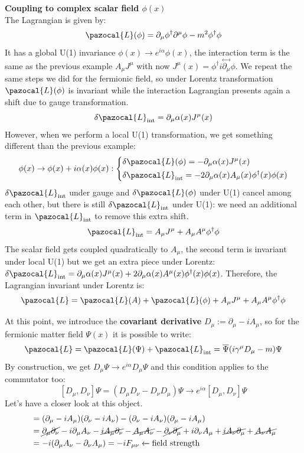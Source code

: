 \documentclass[../main.tex]{subfiles}
\begin{document}
\begin{example}
\textbf{Coupling to complex scalar field $\phi(x)$}\\
The Lagrangian is given by:
\[
\pazocal{L}(\phi)=\partial_\mu\phi^\dagger\partial^\mu\phi-m^2\phi^\dagger\phi
\]
It has a global U(1) invariance $\phi(x)\to e^{i\alpha}\phi(x)$, the interaction term is the same as the previous example $A_\mu J^\mu$ with now $J^\mu(x)=\phi^\dagger i\overset{\leftrightarrow}{\partial_\mu}\phi$. We repeat the same steps we did for the fermionic field, so under Lorentz transformation $\pazocal{L}(\phi)$ is invariant while the interaction Lagrangian presents again a shift due to gauge transformation.
\[
\delta\pazocal{L}_{\text{int}}=\partial_\mu\alpha(x)J^\mu(x)
\]
However, when we perform a local U(1) transformation, we get something different than the previous example:
\[
\phi(x)\to\phi(x)+i\alpha(x)\phi(x):\left\{
\begin{aligned}
&\delta\pazocal{L}(\phi)=-\partial_\mu\alpha(x)J^\mu(x)\\
&\delta\pazocal{L}_{\text{int}}=-2\partial_\mu\alpha(x)A_\mu(x)\phi^\dagger(x)\phi(x)
\end{aligned}
\right.
\]
$\delta\pazocal{L}_{\text{int}}$ under gauge and $\delta\pazocal{L}(\phi)$ under U(1) cancel among each other, but there is still $\delta\pazocal{L}_{\text{int}}$ under U(1): we need an additional term in $\pazocal{L}_{\text{int}}$ to remove this extra shift.
\[
\pazocal{L}_{\text{int}}=A_\mu J^\mu+A_\mu A^\mu\phi^\dagger\phi
\]
The scalar field gets coupled quadratically to $A_\mu$, the second term is invariant under local U(1) but we get an extra piece under Lorentz: $\delta\pazocal{L}_{\text{int}}=\partial_\mu\alpha(x)J^\mu(x)+2\partial_\mu\alpha(x)A^\mu(x)\phi^\dagger(x)\phi(x)$. Therefore, the Lagrangian invariant under Lorentz is:
\[
\pazocal{L}=\pazocal{L}(A)+\pazocal{L}(\phi)+A_\mu J^\mu+A_\mu A^\mu\phi^\dagger\phi
\]
\end{example}
At this point, we introduce the \textbf{covariant derivative} $D_\mu:=\partial_\mu-iA_\mu$, so for the fermionic matter field $\Psi(x)$ it is possible to write:
\[
\pazocal{L}=\pazocal{L}(\Psi)+\pazocal{L}_{\text{int}}=\overline{\Psi}(i\gamma^\mu D_\mu-m)\Psi
\]
By construction, we get $D_\mu\Psi\to e^{i\alpha}D_\mu\Psi$ and this condition applies to the commutator too:
\[
[D_\mu,D_\nu]\Psi=(D_\mu D_\nu-D_\nu D_\mu)\Psi\to e^{i\alpha}[D_\mu,D_\nu]\Psi
\]
Let's have a closer look at this object.
\begin{align*}
[D_\mu,D_\nu]&=(\partial_\mu-iA_\mu)(\partial_\nu-iA_\nu)-(\partial_\nu-iA_\nu)(\partial_\mu-iA_\mu)\\
&=\cancel{\partial_\mu\partial_\nu}-i\partial_\mu A_\nu-\cancel{iA_\mu\partial_\nu}-\cancel{A_\mu A_\nu}-\cancel{\partial_\nu\partial_\mu}+i\partial_\nu A_\mu+\cancel{iA_\nu\partial_\mu}+\cancel{A_\nu A_\mu}\\
&=-i(\partial_\mu A_\nu-\partial_\nu A_\mu)=-iF_{\mu\nu}\xleftarrow[]{}\text{field strength}
\end{align*}
\end{document}
